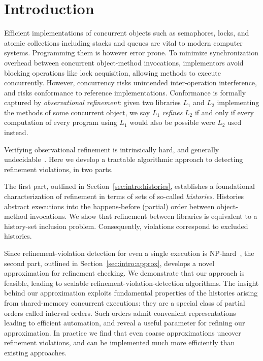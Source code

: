 \section{Introduction}

Efficient implementations of concurrent objects such as semaphores, locks, and
atomic collections including stacks and queues are vital to modern computer
systems. Programming them is however error prone. To minimize synchronization
overhead between concurrent object-method invocations, implementors avoid
blocking operations like lock acquisition, allowing methods to execute
concurrently. However, concurrency risks unintended inter-operation
interference, and risks conformance to reference implementations. Conformance
is formally captured by \emph{observational refinement}: given two libraries
$L_1$ and $L_2$ implementing the methods of some concurrent object, we say
$L_1$ \emph{refines} $L_2$ if and only if every computation of every program
using $L_1$ would also be possible were $L_2$ used instead.

Verifying observational refinement is intrinsically hard, and generally
undecidable~\cite{conf/esop/BouajjaniEEH13}. Here we develop a tractable
algorithmic approach to detecting refinement violations, in two parts.

The first part, outlined in Section~\ref{sec:intro:histories}, establishes a
foundational characterization of refinement in terms of sets of so-called
\emph{histories}. Histories abstract executions into the happens-before
(partial) order between object-method invocations. We show that refinement
between libraries is equivalent to a history-set inclusion problem.
Consequently, violations correspond to excluded histories.

Since refinement-violation detection for even a single execution is
NP-hard~\cite{journals/siamcomp/GibbonsK97}, the second part, outlined in
Section~\ref{sec:intro:approx}, develops a novel approximation for refinement
checking. We demonstrate that our approach is feasible, leading to scalable
refinement-violation-detection algorithms. The insight behind our approximation
exploits fundamental properties of the histories arising from shared-memory
concurrent executions: they are a special class of partial orders called
interval orders. Such orders admit convenient representations leading to
efficient automation, and reveal a useful parameter for refining our
approximation. In practice we find that even coarse approximations uncover
refinement violations, and can be implemented much more efficiently than
existing approaches.


